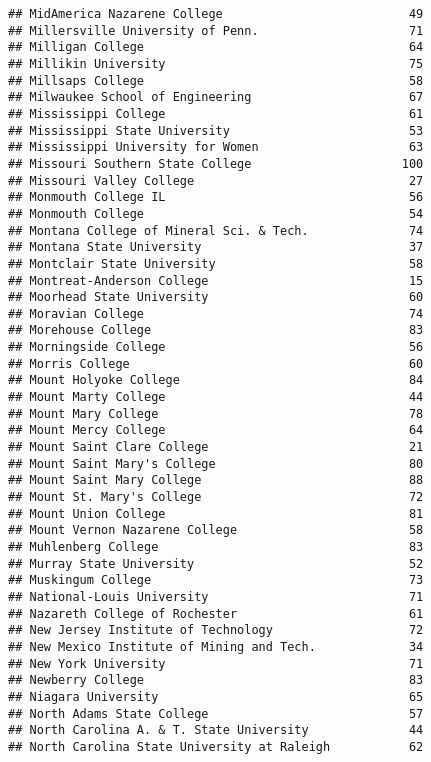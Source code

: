 \documentclass[
]{article}
\begin{document}
\begin{verbatim}
## MidAmerica Nazarene College                          49
## Millersville University of Penn.                     71
## Milligan College                                     64
## Millikin University                                  75
## Millsaps College                                     58
## Milwaukee School of Engineering                      67
## Mississippi College                                  61
## Mississippi State University                         53
## Mississippi University for Women                     63
## Missouri Southern State College                     100
## Missouri Valley College                              27
## Monmouth College IL                                  56
## Monmouth College                                     54
## Montana College of Mineral Sci. & Tech.              74
## Montana State University                             37
## Montclair State University                           58
## Montreat-Anderson College                            15
## Moorhead State University                            60
## Moravian College                                     74
## Morehouse College                                    83
## Morningside College                                  56
## Morris College                                       60
## Mount Holyoke College                                84
## Mount Marty College                                  44
## Mount Mary College                                   78
## Mount Mercy College                                  64
## Mount Saint Clare College                            21
## Mount Saint Mary's College                           80
## Mount Saint Mary College                             88
## Mount St. Mary's College                             72
## Mount Union College                                  81
## Mount Vernon Nazarene College                        58
## Muhlenberg College                                   83
## Murray State University                              52
## Muskingum College                                    73
## National-Louis University                            71
## Nazareth College of Rochester                        61
## New Jersey Institute of Technology                   72
## New Mexico Institute of Mining and Tech.             34
## New York University                                  71
## Newberry College                                     83
## Niagara University                                   65
## North Adams State College                            57
## North Carolina A. & T. State University              44
## North Carolina State University at Raleigh           62

\end{verbatim}
\end{document}
